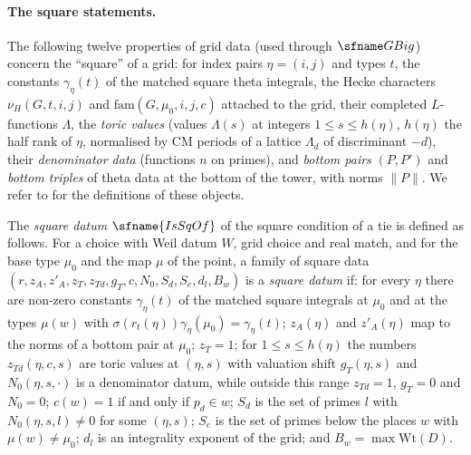 \paragraph{The square statements.}
The following twelve properties of grid data (used through $\fitGBig$) concern the ``square'' of a grid: for index
pairs $\eta=(i,j)$ and types $t$, the constants $\gamma_\eta(t)$ of the matched square theta integrals, the Hecke characters
$\nu_H(G,t,i,j)$ and $\mathrm{fam}(G,\mu_0,i,j,c)$ attached to the grid, their completed $L$-functions $\Lambda$, the
\emph{toric values} (values $\Lambda(s)$ at integers $1\le s\le h(\eta)$, $h(\eta)$ the half rank of $\eta$, normalised by
CM periods of a lattice $\Lambda_d$ of discriminant $-d$), their \emph{denominator data} (functions $n$ on primes), and
\emph{bottom pairs} $(P,P')$ and \emph{bottom triples} of theta data at the bottom of the tower, with norms $\|P\|$. We refer
to \cite{LeanSource2026} for the definitions of these objects.

The \emph{square datum} $\sfname{IsSqOf}$ of the square condition of a tie is defined as follows. For a choice with Weil datum
$W$, grid choice and real match, and for the base type $\mu_0$ and the map $\mu$ of the point, a family of square data
$(r,z_A,z'_A,z_T,z_{Td},g_T,c,N_0,S_d,S_e,d_l,B_w)$ is a \emph{square datum} if: for every $\eta$ there are non-zero
constants $\gamma_\eta(t)$ of the matched square integrals at $\mu_0$ and at the types $\mu(w)$ with $\sigma(r_t(\eta))\gamma_\eta(\mu_0)=\gamma_\eta(t)$;
$z_A(\eta)$ and $z'_A(\eta)$ map to the norms of a bottom pair at $\mu_0$; $z_T=1$; for $1\le s\le h(\eta)$ the numbers
$z_{Td}(\eta,c,s)$ are toric values at $(\eta,s)$ with valuation shift $g_T(\eta,s)$ and $N_0(\eta,s,\cdot)$ is a denominator
datum, while outside this range $z_{Td}=1$, $g_T=0$ and $N_0=0$; $c(w)=1$ if and only if $p_d\in w$; $S_d$ is the set of
primes $l$ with $N_0(\eta,s,l)\ne0$ for some $(\eta,s)$; $S_e$ is the set of primes below the places $w$ with $\mu(w)\ne\mu_0$;
$d_l$ is an integrality exponent of the grid; and $B_w=\max\mathrm{Wt}(D)$.


